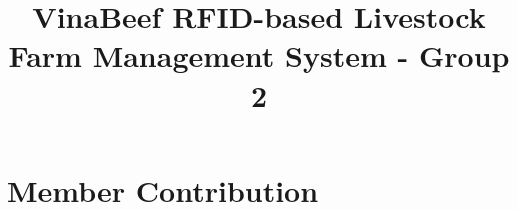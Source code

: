 \documentclass[final]{hcmut-report}
\title{VinaBeef RFID-based Livestock Farm Management System - Group 2}
\begin{document}
\nocite{rabbitmq,pgAsyncCommit,rfc9110,awsRetries,owaspAuthz,owaspLogging,awsOutbox,seiQAW,c4model,richardsStyles,nygardADR,ibmActors}
\coverpage%


\section*{Member Contribution}
\end{document}

